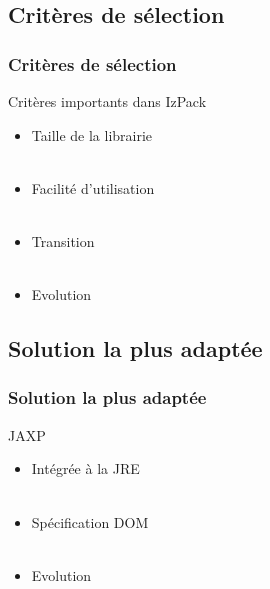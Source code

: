 \subsection{Critères de sélection}
\begin{frame}\frametitle{Critères de sélection}
\begin{beamerboxesrounded}[shadow=true]{Critères importants dans IzPack}
\begin{itemize}
	\item Taille de la librairie\\
	~\\
	\item Facilité d'utilisation\\
	~\\
	\item Transition\\
	~\\
	\item Evolution
\end{itemize}
\end{beamerboxesrounded}
\end{frame}
\subsection{Solution la plus adaptée}
\begin{frame}\frametitle{Solution la plus adaptée}
\begin{beamerboxesrounded}[shadow=true]{JAXP}
\begin{itemize}
	\item Intégrée à la JRE\\
	~\\
	\item Spécification DOM\\
	~\\
	\item Evolution
\end{itemize}
\end{beamerboxesrounded}
\end{frame}
